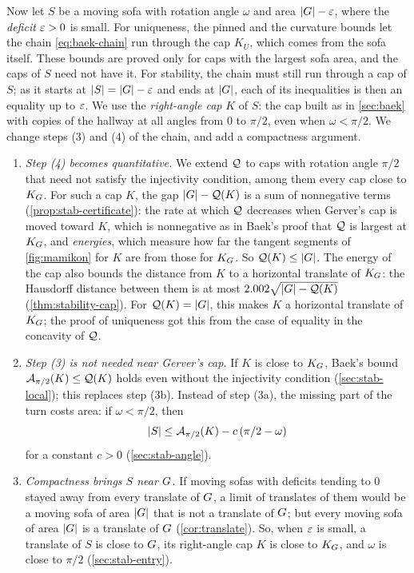 Now let $S$ be a moving sofa with rotation angle $\omega$ and area
$\lvert G\rvert-\varepsilon$, where the \emph{deficit} $\varepsilon>0$ is small. For uniqueness, the
pinned and the curvature bounds let the chain \eqref{eq:baek-chain} run through
the cap $K_U$, which comes from the sofa itself. These bounds are proved only for
caps with the largest sofa area, and the caps of $S$ need not have it. For
stability, the chain must still run through a cap of $S$; as it starts at
$\lvert S\rvert=\lvert G\rvert-\varepsilon$ and ends at $\lvert G\rvert$, each of its inequalities is then an
equality up to $\varepsilon$. We use the \emph{right-angle cap} $K$ of $S$: the cap
built as in \cref{sec:baek} with copies of the hallway at all angles from $0$ to
$\pi/2$, even when $\omega<\pi/2$. We change steps (3) and (4) of the chain, and
add a compactness argument.
\begin{enumerate}[label=(\roman*)]
  \item \emph{Step (4) becomes quantitative.} We extend $\mathcal{Q}$ to caps with
  rotation angle $\pi/2$ that need not satisfy the injectivity condition, among
  them every cap close to $K_G$. For such a cap $K$, the gap $\lvert G\rvert-\mathcal{Q}(K)$ is
  a sum of nonnegative terms (\cref{prop:stab-certificate}): the rate at which
  $\mathcal{Q}$ decreases when Gerver's cap is moved toward $K$, which is nonnegative as
  in Baek's proof that $\mathcal{Q}$ is largest at $K_G$, and \emph{energies}, which
  measure how far the tangent segments of \cref{fig:mamikon} for $K$ are from
  those for $K_G$. So $\mathcal{Q}(K)\le\lvert G\rvert$. The energy of the cap also bounds the
  distance from $K$ to a horizontal translate of $K_G$: the Hausdorff distance
  between them is at most $2.002\sqrt{\lvert G\rvert-\mathcal{Q}(K)}$
  (\cref{thm:stability-cap}). For $\mathcal{Q}(K)=\lvert G\rvert$, this makes $K$ a horizontal
  translate of $K_G$; the proof of uniqueness got this from the case of equality
  in the concavity of $\mathcal{Q}$.
  \item \emph{Step (3) is not needed near Gerver's cap.} If $K$ is close to
  $K_G$, Baek's bound $\mathcal{A}_{\pi/2}(K)\le\mathcal{Q}(K)$ holds even without the
  injectivity condition (\cref{sec:stab-local}); this replaces step (3b).
  Instead of step (3a), the missing part of the turn costs area: if
  $\omega<\pi/2$, then
  \[
    \lvert S\rvert\le\mathcal{A}_{\pi/2}(K)-c\,(\pi/2-\omega)
  \]
  for a constant $c>0$ (\cref{sec:stab-angle}).
  \item \emph{Compactness brings $S$ near $G$.} If moving sofas with deficits
  tending to $0$ stayed away from every translate of $G$, a limit of
  translates of them would be a moving sofa of area $\lvert G\rvert$ that is not a
  translate of $G$; but every moving sofa of area $\lvert G\rvert$ is a translate of
  $G$ (\cref{cor:translate}). So, when $\varepsilon$ is small, a translate of $S$ is
  close to $G$, its right-angle cap $K$ is close to $K_G$, and $\omega$ is
  close to $\pi/2$ (\cref{sec:stab-entry}).
\end{enumerate}
